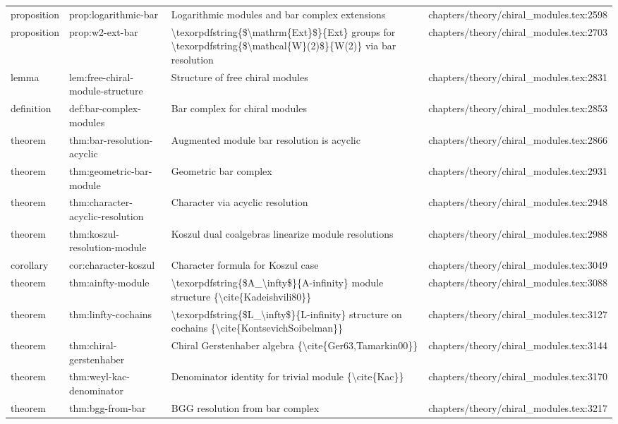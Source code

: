 \documentclass[11pt]{article}
\begin{document}
\begin{longtable}{L{0.10\textwidth}L{0.26\textwidth}L{0.42\textwidth}L{0.22\textwidth}}
proposition & prop:logarithmic-bar & Logarithmic modules and bar complex extensions & chapters/theory/chiral\_modules.tex:2598\\
proposition & prop:w2-ext-bar & \textbackslash{}texorpdfstring\{\$\textbackslash{}mathrm\{Ext\}\$\}\{Ext\} groups for \textbackslash{}texorpdfstring\{\$\textbackslash{}mathcal\{W\}(2)\$\}\{W(2)\} via bar resolution & chapters/theory/chiral\_modules.tex:2703\\
lemma & lem:free-chiral-module-structure & Structure of free chiral modules & chapters/theory/chiral\_modules.tex:2831\\
definition & def:bar-complex-modules & Bar complex for chiral modules & chapters/theory/chiral\_modules.tex:2853\\
theorem & thm:bar-resolution-acyclic & Augmented module bar resolution is acyclic & chapters/theory/chiral\_modules.tex:2866\\
theorem & thm:geometric-bar-module & Geometric bar complex & chapters/theory/chiral\_modules.tex:2931\\
theorem & thm:character-acyclic-resolution & Character via acyclic resolution & chapters/theory/chiral\_modules.tex:2948\\
theorem & thm:koszul-resolution-module & Koszul dual coalgebras linearize module resolutions & chapters/theory/chiral\_modules.tex:2988\\
corollary & cor:character-koszul & Character formula for Koszul case & chapters/theory/chiral\_modules.tex:3049\\
theorem & thm:ainfty-module & \textbackslash{}texorpdfstring\{\$A\_\textbackslash{}infty\$\}\{A-infinity\} module structure \{\textbackslash{}cite\{Kadeishvili80\}\} & chapters/theory/chiral\_modules.tex:3088\\
theorem & thm:linfty-cochains & \textbackslash{}texorpdfstring\{\$L\_\textbackslash{}infty\$\}\{L-infinity\} structure on cochains \{\textbackslash{}cite\{KontsevichSoibelman\}\} & chapters/theory/chiral\_modules.tex:3127\\
theorem & thm:chiral-gerstenhaber & Chiral Gerstenhaber algebra \{\textbackslash{}cite\{Ger63,Tamarkin00\}\} & chapters/theory/chiral\_modules.tex:3144\\
theorem & thm:weyl-kac-denominator & Denominator identity for trivial module \{\textbackslash{}cite\{Kac\}\} & chapters/theory/chiral\_modules.tex:3170\\
theorem & thm:bgg-from-bar & BGG resolution from bar complex & chapters/theory/chiral\_modules.tex:3217\\

\end{longtable}
\end{document}
